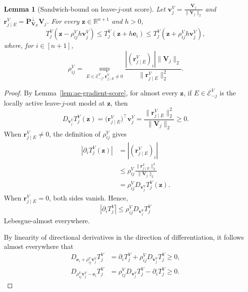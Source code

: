 \documentclass[12pt]{article}
\newtheorem{lemma}{Lemma}
\theoremstyle{definition}
\begin{document}
\begin{lemma}[Sandwich-bound on leave-$j$-out score]
\label{lem:coordinate-direction-comparison}
Let $\boldsymbol v_j^V=\frac{\boldsymbol V_j}{\|\boldsymbol V_j\|_2}$ and $\boldsymbol r_{j\mid E}^V=\boldsymbol P_{\boldsymbol V_E}^\perp \boldsymbol V_j$. 
For every $\boldsymbol z\in\mathbb R^{n+1}$ and $h>0$,
\[
    T_j^V(\boldsymbol z-\rho_{ij}^V h\boldsymbol v_j^V)
    \le
    T_j^V(\boldsymbol z+h\boldsymbol e_i)
    \le
    T_j^V(\boldsymbol z+\rho_{ij}^V h\boldsymbol v_j^V),
\]
where, for $i\in[n+1]$, 
\[
    \rho_{ij}^V
    =
    \sup_{{E\in\mathcal E_{-j}^V,\boldsymbol r_{j\mid E}^V\ne0}}
    \frac{|(\boldsymbol r_{j\mid E}^V)_i|\|\boldsymbol V_j\|_2}
         {\|\boldsymbol r_{j\mid E}^V\|_2^2}.
\]
\end{lemma}

\begin{proof}
By Lemma~\ref{lem:ae-gradient-score}, for almost every
$\boldsymbol z$, if $E\in\mathcal E_{-j}^V$ is the locally active
leave-$j$-out model at $\boldsymbol z$, then
\[
    D_{\boldsymbol v_j^V}T_j^V(\boldsymbol z)
    =
    \bigl(\boldsymbol r_{j\mid E}^V\bigr)^\top
    \boldsymbol v_j^V
    =
    \frac{\|\boldsymbol r_{j\mid E}^V\|_2^2}
         {\|\boldsymbol V_j\|_2}
    \ge 0.
\]
When $\boldsymbol r_{j\mid E}^V\ne0$, the definition of
$\rho_{ij}^V$ gives
\[
\begin{aligned}
    |\partial_iT_j^V(\boldsymbol z)|
    &=
    |(\boldsymbol r_{j\mid E}^V)_i|\\
    &\le
    \rho_{ij}^V
    \frac{\|\boldsymbol r_{j\mid E}^V\|_2^2}
         {\|\boldsymbol V_j\|_2}\\
    &=
    \rho_{ij}^V
    D_{\boldsymbol v_j^V}T_j^V(\boldsymbol z).
\end{aligned}
\]
When $\boldsymbol r_{j\mid E}^V=0$, both sides vanish. Hence,
\[
    |\partial_iT_j^V|
    \le
    \rho_{ij}^V D_{\boldsymbol v_j^V}T_j^V
\]
Lebesgue-almost everywhere.

By linearity of directional derivatives in the direction of differentiation,
it follows almost everywhere that
\[
\begin{aligned}
    D_{\boldsymbol e_i+\rho_{ij}^V\boldsymbol v_j^V}T_j^V
    &=
    \partial_iT_j^V
    +
    \rho_{ij}^V D_{\boldsymbol v_j^V}T_j^V
    \ge0,\\
    D_{\rho_{ij}^V\boldsymbol v_j^V-\boldsymbol e_i}T_j^V
    &=
    \rho_{ij}^V D_{\boldsymbol v_j^V}T_j^V
    -
    \partial_iT_j^V
    \ge0.
\end{aligned}
\]


\end{proof}
\end{document}
